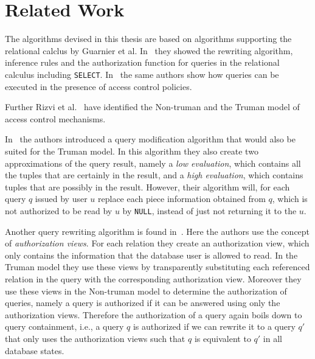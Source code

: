 \section{Related Work}

The algorithms devised in this thesis are based on algorithms supporting the relational calclus by Guarnier et al. In~\cite{guarnieri2016strong} they showed the rewriting algorithm, inference rules and the authorization function for queries in the relational calculus including \texttt{SELECT}.
%
In~\cite{guarnieri2014optimal} the same authors show how queries can be executed in the presence of access control policies.

Further Rizvi et al.~\cite{rizvi2004extending} have identified the Non-truman and the Truman model of access control mechanisms.

In~\cite{wang2007correctness} the authors introduced a query modification algorithm that would also be suited for the Truman model.
%
In this algorithm they also create two approximations of the query result, namely a \emph{low evaluation}, which contains all the tuples that are certainly in the result, and a \emph{high evaluation}, which contains tuples that are possibly in the result.
%
However, their algorithm will, for each query $q$ issued by user $u$ replace each piece information obtained from $q$, which is not authorized to be read by $u$ by \texttt{NULL}, instead of just not returning it to the $u$.

Another query rewriting algorithm is found in~\cite{rizvi2004extending}. 
%
Here the authors use the concept of \emph{authorization views}.
%
For each relation they create an authorization view, which only contains the information that the database user is allowed to read.
%
In the Truman model they use these views by transparently substituting each referenced relation in the query with the corresponding authorization view.
%
Moreover they use these views in the Non-truman model to determine the authorization of queries, namely a query is authorized if it can be answered using only the authorization views.
%
Therefore the authorization of a query again boils down to query containment, i.e., a query $q$ is authorized if we can rewrite it to a query $q'$ that only uses the authorization views such that $q$ is equivalent to $q'$ in all database states.